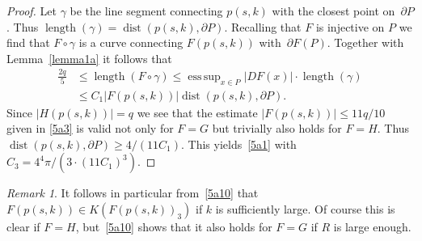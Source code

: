 \documentclass[12pt,a4paper]{amsart}
\theoremstyle{plain}
\theoremstyle{definition}
\theoremstyle{remark}
\newtheorem{remark}[theorem]{Remark}
\DeclareMathOperator*{\esssup}{ess\,sup}
\def\dist{\operatorname{dist}}
\def\length{\operatorname{length}}
\numberwithin{equation}{section}
\begin{document}
\begin{proof}
Let $\gamma$ be the line segment connecting $p(s,k)$ with the closest point on~$\partial P$.
Thus $\length(\gamma)=\dist(p(s,k),\partial P)$. 
Recalling that $F$ is injective on $P$ we find that
$F\circ\gamma$ is a curve connecting $F(p(s,k))$ with~$\partial F(P)$.
Together with Lemma~\ref{lemma1a} it follows that 
\begin{equation}\label{5b1}
\begin{aligned}
\frac{2q}{5}
&\leq \length( F\circ \gamma)
\leq \esssup_{x\in P} |DF(x)| \cdot \length(\gamma)
\\ &
\leq C_1|F(p(s,k))|\dist(p(s,k),\partial P).
\end{aligned}
\end{equation}
Since $|H(p(s,k))|=q$ we see that the estimate $|F(p(s,k))|\leq 11q/10$ 
given in \eqref{5a3} is valid not only for $F=G$ but trivially also holds for $F=H$.
Thus $\dist(p(s,k),\partial P)\geq 4/(11 C_1)$.
This yields~\eqref{5a1} with $C_3=4^4 \pi/(3\cdot (11C_1)^3)$.
\end{proof}

\begin{remark}\label{remark1}
It follows in particular from~\eqref{5a10} that $F(p(s,k))\in K(F(p(s,k))_3)$ if
$k$ is sufficiently large.
Of course this is clear if $F=H$, but~\eqref{5a10} shows that it also holds
for $F=G$ if $R$ is large enough.
\end{remark}
\end{document}
